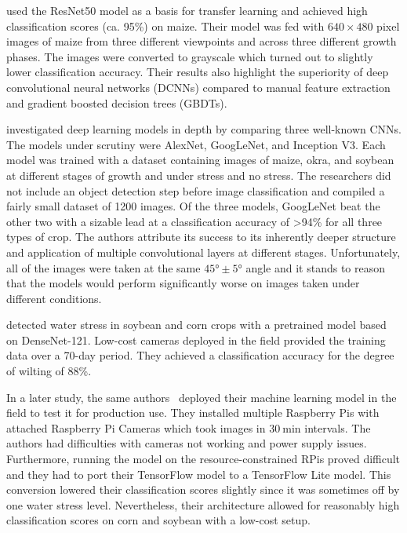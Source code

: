 \documentclass[draft,final]{vutinfth} %
\begin{document}
\textcite{an2019} used the ResNet50 model as a basis for transfer
learning and achieved high classification scores (ca. 95\%) on
maize. Their model was fed with $640\times480$ pixel images of maize
from three different viewpoints and across three different growth
phases. The images were converted to grayscale which turned out to
slightly lower classification accuracy. Their results also highlight
the superiority of deep convolutional neural networks (DCNNs) compared
to manual feature extraction and gradient boosted decision trees
(GBDTs).

\textcite{chandel2021} investigated deep learning models in depth by
comparing three well-known CNNs. The models under scrutiny were
AlexNet, GoogLeNet, and Inception V3. Each model was trained with a
dataset containing images of maize, okra, and soybean at different
stages of growth and under stress and no stress. The researchers did
not include an object detection step before image classification and
compiled a fairly small dataset of 1200 images. Of the three models,
GoogLeNet beat the other two with a sizable lead at a classification
accuracy of >94\% for all three types of crop. The authors attribute
its success to its inherently deeper structure and application of
multiple convolutional layers at different stages. Unfortunately, all
of the images were taken at the same $\ang{45}\pm\ang{5}$ angle and it
stands to reason that the models would perform significantly worse on
images taken under different conditions.

\textcite{ramos-giraldo2020} detected water stress in soybean and corn
crops with a pretrained model based on DenseNet-121. Low-cost cameras
deployed in the field provided the training data over a 70-day
period. They achieved a classification accuracy for the degree of
wilting of 88\%.

In a later study, the same authors~\cite{ramos-giraldo2020a} deployed
their machine learning model in the field to test it for production
use. They installed multiple Raspberry Pis with attached Raspberry Pi
Cameras which took images in $\qty{30}{\minute}$ intervals. The
authors had difficulties with cameras not working and power supply
issues. Furthermore, running the model on the resource-constrained
RPis proved difficult and they had to port their TensorFlow model to a
TensorFlow Lite model. This conversion lowered their classification
scores slightly since it was sometimes off by one water stress
level. Nevertheless, their architecture allowed for reasonably high
classification scores on corn and soybean with a low-cost setup.
\end{document}
